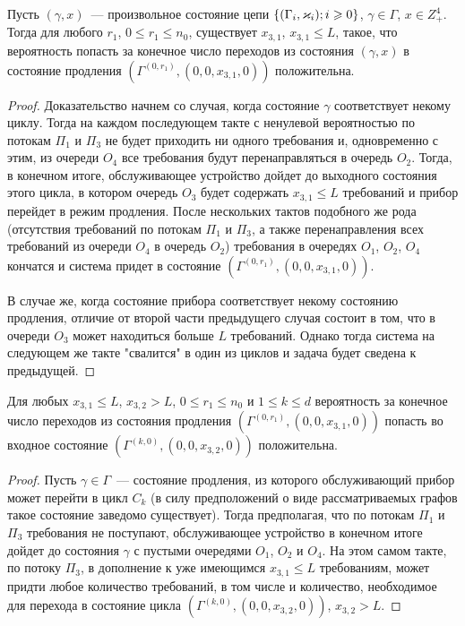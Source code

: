 \documentclass[a4paper,12pt,russian]{extarticle}
\newcommand{\G}{\Gamma}
\newcommand{\Mark}{\{(\G_i, \vk_i); i \geqslant 0\}}
\newcommand{\ga}[1]{\Gamma^{\left( #1 \right)} }
\begin{document}
\begin{lemma}
Пусть $(\gamma,x)$~--- произвольное состояние цепи $\Mark$, $\gamma\in \G$, $x \in Z_+^4$. Тогда для любого $r_1$, $0\leqslant r_1 \leqslant n_0$, существует $x_{3,1}$, $x_{3,1} \leqslant L$, такое, что вероятность попасть за конечное число переходов из состояния $(\gamma,x)$ в состояние продления $(\ga{0,r_1}, (0,0,x_{3,1},0))$ положительна.
\label{lemma:1}
\end{lemma}
\begin{proof}
Доказательство начнем со случая, когда состояние $\gamma$ соответствует некому циклу. Тогда на каждом последующем такте с ненулевой вероятностью по потокам $\Pi_1$ и $\Pi_3$ не будет приходить ни одного требования и, одновременно с этим, из очереди $O_4$ все требования будут перенаправляться в очередь $O_2$. Тогда, в конечном итоге, обслуживающее устройство дойдет до выходного состояния этого цикла, в котором очередь $O_3$ будет содержать $x_{3,1} \leqslant L$ требований и прибор перейдет в режим продления. После нескольких тактов подобного же рода (отсутствия требований по потокам $\Pi_1$ и $\Pi_3$, а также перенаправления всех требований из очереди $O_4$ в очередь $O_2$) требования в очередях $O_1$, $O_2$, $O_4$ кончатся и система придет в состояние $(\ga{0,r_1}, (0,0,x_{3,1},0))$.

В случае же, когда состояние прибора соответствует некому состоянию продления, отличие от второй части предыдущего случая состоит в том, что в очереди $O_3$ может находиться больше $L$ требований. Однако тогда система на следующем же такте "свалится" в один из циклов и задача будет сведена к предыдущей. 
\end{proof}

\begin{lemma}
Для любых $x_{3,1} \leqslant L$, $x_{3,2} > L$, $0 \leqslant r_1 \leqslant n_0$ и $1 \leqslant k \leqslant d$ вероятность за конечное число переходов из состояния продления $(\ga{0,r_1},(0,0,x_{3,1},0))$ попасть во входное состояние $(\ga{k,0},(0,0,x_{3,2},0))$ положительна.
\label{lemma:2}
\end{lemma}
\begin{proof}
Пусть $\gamma \in \G$~--- состояние продления, из которого обслуживающий прибор может перейти в цикл $C_k$ (в силу предположений о виде рассматриваемых графов такое состояние заведомо существует). Тогда предполагая, что по потокам $\Pi_1$ и $\Pi_3$ требования не поступают, обслуживающее устройство в конечном итоге дойдет до состояния $\gamma$ с пустыми очередями $O_1$, $O_2$ и $O_4$. На этом самом такте, по потоку $\Pi_3$, в дополнение к уже имеющимся $x_{3,1} \leqslant L$ требованиям, может придти любое количество требований, в том числе и количество, необходимое для перехода в состояние цикла $(\ga{k,0},(0,0,x_{3,2},0))$, $x_{3,2} > L$.
\end{proof}
\end{document}

